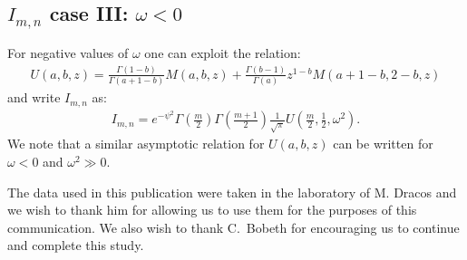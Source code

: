 \documentclass[a4paper,11pt]{article}
\begin{document}
\subsection*{$I_{m,n}$ case III: $ \omega <0$}
%

For negative values of $\omega$ one can exploit the relation:
\begin{align}
U(a,b,z) = \frac{\Gamma(1-b) }{\Gamma(a+1-b)}M(a,b,z) + \frac{\Gamma(b-1) }{\Gamma(a)} z^{1-b} M(a+1-b, 2-b, z )
\end{align}
and write $I_{m,n}$ as:
\begin{align}
I_{m,n} = e^{ -\psi^2 } \Gamma\left( \frac{m}{2} \right)   \Gamma\left( \frac{m+1}{2} \right) \frac{1}{\sqrt{\pi}} U\left( \frac{m}{2}, \frac{1}{2}, \omega^2  \right). 
\end{align}
We note that a similar  asymptotic relation for $U(a,b,z)$ can be written for $\omega<0$ and $\omega^2 \gg 0$. 


\acknowledgments
%

The data used in this publication were taken in the laboratory of M. Dracos and we wish to thank him for allowing us to use them for the purposes of this communication. 
We also wish to thank C.~Bobeth for encouraging us to continue and complete this study.


\end{document}
